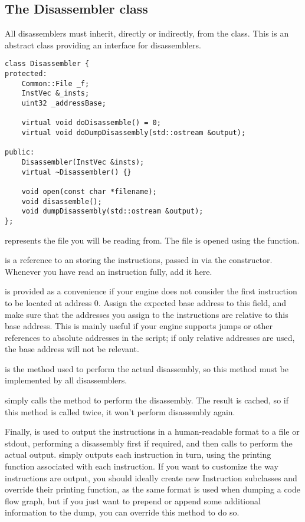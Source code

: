 \subsection{The Disassembler class}
All disassemblers must inherit, directly or indirectly, from the  class. This is an abstract class providing an interface for disassemblers.

\begin{C++}
\begin{lstlisting}
class Disassembler {
protected:
	Common::File _f;
	InstVec &_insts;
	uint32 _addressBase;

	virtual void doDisassemble() = 0;
	virtual void doDumpDisassembly(std::ostream &output);

public:
	Disassembler(InstVec &insts);
	virtual ~Disassembler() {}

	void open(const char *filename);
	void disassemble();
	void dumpDisassembly(std::ostream &output);
};
\end{lstlisting}
\end{C++}

 represents the file you will be reading from. The file is opened using the  function.

 is a reference to an  storing the instructions, passed in via the constructor. Whenever you have read an instruction fully, add it here.

 is provided as a convenience if your engine does not consider the first instruction to be located at address 0. Assign the expected base address to this field, and make sure that the addresses you assign to the instructions are relative to this base address. This is mainly useful if your engine supports jumps or other references to absolute addresses in the script; if only relative addresses are used, the base address will not be relevant.

 is the method used to perform the actual disassembly, so this method must be implemented by all disassemblers.

 simply calls the  method to perform the disassembly. The result is cached, so if this method is called twice, it won't perform disassembly again.

Finally,  is used to output the instructions in a human-readable format to a file or stdout, performing a disassembly first if required, and then calls  to perform the actual output.  simply outputs each instruction in turn, using the printing function associated with each instruction. If you want to customize the way instructions are output, you should ideally create new Instruction subclasses and override their printing function, as the same format is used when dumping a code flow graph, but if you just want to prepend or append some additional information to the dump, you can override this method to do so.

